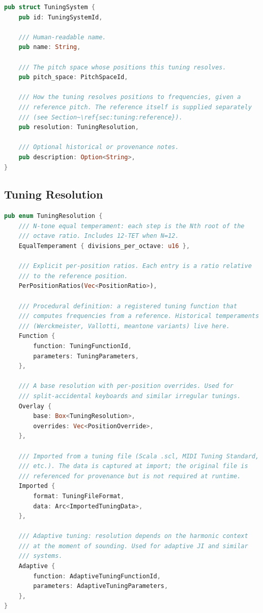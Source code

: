 \documentclass[11pt,letterpaper]{report}
\begin{document}
\begin{lstlisting}[language=Rust]
pub struct TuningSystem {
    pub id: TuningSystemId,

    /// Human-readable name.
    pub name: String,

    /// The pitch space whose positions this tuning resolves.
    pub pitch_space: PitchSpaceId,

    /// How the tuning resolves positions to frequencies, given a
    /// reference pitch. The reference itself is supplied separately
    /// (see Section~\ref{sec:tuning:reference}).
    pub resolution: TuningResolution,

    /// Optional historical or provenance notes.
    pub description: Option<String>,
}
\end{lstlisting}

\subsection{Tuning Resolution}

\begin{lstlisting}[language=Rust]
pub enum TuningResolution {
    /// N-tone equal temperament: each step is the Nth root of the
    /// octave ratio. Includes 12-TET when N=12.
    EqualTemperament { divisions_per_octave: u16 },

    /// Explicit per-position ratios. Each entry is a ratio relative
    /// to the reference position.
    PerPositionRatios(Vec<PositionRatio>),

    /// Procedural definition: a registered tuning function that
    /// computes frequencies from a reference. Historical temperaments
    /// (Werckmeister, Vallotti, meantone variants) live here.
    Function {
        function: TuningFunctionId,
        parameters: TuningParameters,
    },

    /// A base resolution with per-position overrides. Used for
    /// split-accidental keyboards and similar irregular tunings.
    Overlay {
        base: Box<TuningResolution>,
        overrides: Vec<PositionOverride>,
    },

    /// Imported from a tuning file (Scala .scl, MIDI Tuning Standard,
    /// etc.). The data is captured at import; the original file is
    /// referenced for provenance but is not required at runtime.
    Imported {
        format: TuningFileFormat,
        data: Arc<ImportedTuningData>,
    },

    /// Adaptive tuning: resolution depends on the harmonic context
    /// at the moment of sounding. Used for adaptive JI and similar
    /// systems.
    Adaptive {
        function: AdaptiveTuningFunctionId,
        parameters: AdaptiveTuningParameters,
    },
}
\end{lstlisting}
\end{document}
